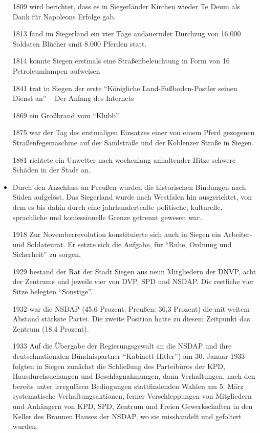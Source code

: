 \documentclass[paper=a4, fontsize=11pt]{scrartcl} %
\numberwithin{equation}{section}		%
\numberwithin{figure}{section}			%
\numberwithin{table}{section}			%
\begin{document}
\begin{itemize}
 	\item [1809] wird berichtet, dass es in Siegerländer Kirchen wieder Te Deum als Dank für Napoleons Erfolge gab.
	\item [1813] fand im Siegerland ein vier Tage andauernder Durchzug von 16.000 Soldaten Blücher smit 8.000 Pferden statt. 
	\item [1814] konnte Siegen erstmals eine Straßenbeleuchtung in Form von 16 Petroleumlampen aufweisen
	\item [1841] trat in Siegen der erste \enquote{Königliche Land-Fußboden-Postler seinen Dienst an} – Der Anfang des Internets
 	\item [1869] ein Großbrand vom \enquote{Klubb}
 	\item [1875] war der Tag des erstmaligen Einsatzes einer von einem Pferd gezogenen Straßenfegemaschine auf der Sandstraße und der Koblenzer Straße in Siegen.
 	\item [1881] richtete ein Unwetter nach wochenlang anhaltender Hitze schwere Schäden in der Stadt an.
 	\item Durch den Anschluss an Preußen wurden die historischen Bindungen nach Süden aufgelöst. Das Siegerland wurde nach Westfalen hin ausgerichtet, von dem es bis dahin durch eine jahrhundertealte politische, kulturelle, sprachliche und konfessionelle Grenze getrennt gewesen war.
 	\item [1918] Zur Novemberrevolution konstituierte sich auch in Siegen ein Arbeiter- und Soldatenrat. Er setzte sich die Aufgabe, für \enquote{Ruhe, Ordnung und Sicherheit} zu sorgen.
 	\item [1929] bestand der Rat der Stadt Siegen aus neun Mitgliedern der DNVP, acht der Zentrums und jeweils vier von DVP, SPD und NSDAP. Die restliche vier Sitze belegten \enquote{Sonstige}.
 	\item [1932] war die NSDAP (45,6 Prozent; Preußen: 36,3 Prozent) die mit weitem Abstand stärkste Partei. Die zweite Position hatte zu diesem Zeitpunkt das Zentrum (18,4 Prozent).
 	\item [1933] Auf die Übergabe der Regierungsgewalt an die NSDAP und ihre deutschnationalen Bündnispartner \enquote{Kabinett Hitler}) am 30. Januar 1933 folgten in Siegen zunächst die Schließung des Parteibüros der KPD, Hausdurchsuchungen und Beschlagnahmungen, dann Verhaftungen, nach den bereits unter irregulären Bedingungen stattfindenden Wahlen am 5. März systematische Verhaftungsaktionen, ferner Verschleppungen von Mitgliedern und Anhängern von KPD, SPD, Zentrum und Freien Gewerkschaften in den Keller des Braunen Hauses der NSDAP, wo sie misshandelt und gefoltert wurden.

\end{itemize}
\end{document}
